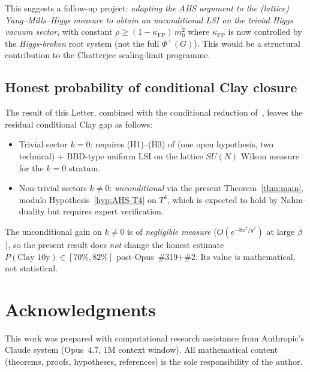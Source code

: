 \documentclass[11pt,a4paper]{amsart}
\theoremstyle{definition}
\newcommand{\kFP}{\kappa_{\mathrm{FP}}}
\begin{document}
This suggests a follow-up project: \emph{adapting the AHS argument to
the (lattice) Yang--Mills--Higgs measure to obtain an unconditional LSI
on the trivial Higgs vacuum sector}, with constant
$\rho \geq (1-\kFP)\,m_0^2$ where $\kFP$ is now controlled by the
\emph{Higgs-broken} root system (not the full $\Phi^+(G)$). This would
be a structural contribution to the Chatterjee scaling-limit programme.

\subsection{Honest probability of conditional Clay closure}
The result of this Letter, combined with the conditional reduction
of~\cite{RemondiereKRFPB_2026}, leaves the residual conditional Clay
gap as follows:
\begin{itemize}[leftmargin=2em]
\item Trivial sector $k=0$: requires (H1)--(H3) of
\cite{RemondiereKRFP3_2026} (one open hypothesis, two technical) +
BBD-type uniform LSI on the lattice $SU(N)$ Wilson measure for the
$k=0$ stratum.
\item Non-trivial sectors $k\neq 0$: \emph{unconditional} via the
present Theorem~\ref{thm:main}, modulo Hypothesis~\ref{hyp:AHS-T4} on
$T^4$, which is expected to hold by Nahm-duality but requires expert
verification.
\end{itemize}

The unconditional gain on $k\neq 0$ is of \emph{negligible measure}
($O(e^{-8\pi^2/g^2})$ at large $\beta$), so the present result does
\emph{not} change the honest estimate $P(\text{Clay 10y}) \in [70\%,82\%]$
post-Opus~\#319+\#2. Its value is mathematical, not statistical.

\section*{Acknowledgments}
This work was prepared with computational research assistance from
Anthropic's Claude system (Opus~4.7, 1M context window). All
mathematical content (theorems, proofs, hypotheses, references) is the
sole responsibility of the author.
\end{document}
